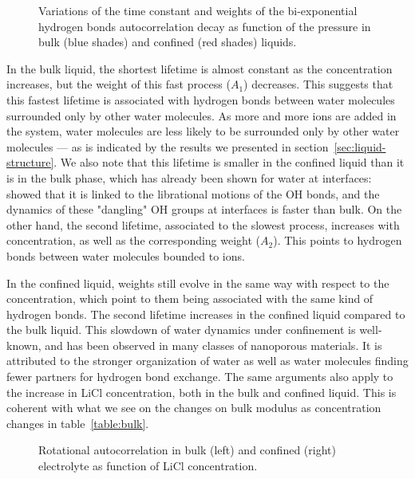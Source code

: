 \documentclass[thesis]{subfiles}
\begin{document}
\begin{figure}[ht]
    \centering
    
    \caption{Variations of the time constant and weights of the bi-exponential
    hydrogen bonds autocorrelation decay as function of the pressure in bulk
    (blue shades) and confined (red shades) liquids.}
    \label{fig:licl-zif:hbonds:fit:pressure}
\end{figure}

In the bulk liquid, the shortest lifetime is almost constant as the
concentration increases, but the weight of this fast process ($A_1$) decreases.
This suggests that this fastest lifetime is associated with hydrogen bonds
between water molecules surrounded only by other water molecules. As more and
more ions are added in the system, water molecules are less likely to be
surrounded only by other water molecules --- as is indicated by the results we
presented in section~\ref{sec:liquid-structure}. We also note that this
lifetime is smaller in the confined liquid than it is in the bulk phase, which
has already been shown for water at interfaces:
\citeauthor{Fogarty2014}\cite{Fogarty2014} showed that it is linked to the
librational motions of the OH bonds, and the dynamics of these "dangling" OH
groups at interfaces is faster than bulk\cite{Scatena2001}. On the other hand,
the second lifetime, associated to the slowest process, increases with
concentration, as well as the corresponding weight ($A_2$). This points to
hydrogen bonds between water molecules bounded to ions.

In the confined liquid, weights still evolve in the same way with respect to the
concentration, which point to them being associated with the same kind of
hydrogen bonds. The second lifetime increases in the confined liquid compared to
the bulk liquid. This slowdown of water dynamics under confinement is
well-known\cite{Fogarty2014}, and has been observed in many classes of
nanoporous materials\cite{Jeffery2004, RomeroVargasCastrillon2009, Haigis2013,
Scalfi2018}. It is attributed to the stronger organization of water as well as
water molecules finding fewer partners for hydrogen bond exchange. The same
arguments also apply to the increase in LiCl concentration, both in the bulk and
confined liquid. This is coherent with what we see on the changes on bulk
modulus as concentration changes in table~\ref{table:bulk}.

\begin{figure}[ht]
    \centering
    
    \caption{Rotational autocorrelation in bulk (left) and confined (right)
    electrolyte as function of LiCl concentration.}
    \label{fig:licl-zif:rotcf}
\end{figure}
\end{document}
